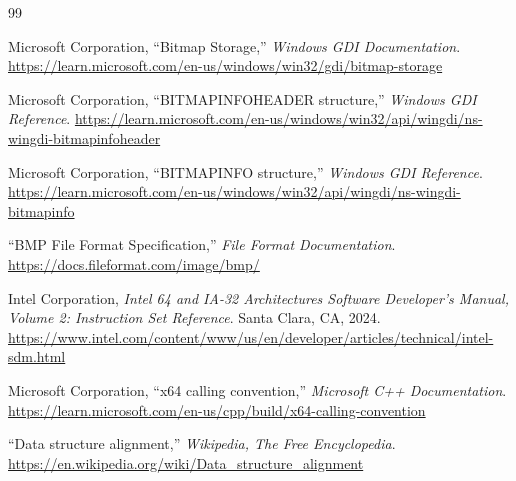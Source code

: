 \documentclass[12pt, letterpaper]{article}
\begin{document}
\begin{thebibliography}{99}

Microsoft Corporation, ``Bitmap Storage,'' \textit{Windows GDI Documentation}.
\url{https://learn.microsoft.com/en-us/windows/win32/gdi/bitmap-storage}

Microsoft Corporation, ``BITMAPINFOHEADER structure,'' \textit{Windows GDI Reference}.
\url{https://learn.microsoft.com/en-us/windows/win32/api/wingdi/ns-wingdi-bitmapinfoheader}

Microsoft Corporation, ``BITMAPINFO structure,'' \textit{Windows GDI Reference}.
\url{https://learn.microsoft.com/en-us/windows/win32/api/wingdi/ns-wingdi-bitmapinfo}

``BMP File Format Specification,'' \textit{File Format Documentation}.
\url{https://docs.fileformat.com/image/bmp/}

Intel Corporation, \textit{Intel\textregistered{} 64 and IA-32 Architectures Software Developer's Manual, Volume 2: Instruction Set Reference}. Santa Clara, CA, 2024.
\url{https://www.intel.com/content/www/us/en/developer/articles/technical/intel-sdm.html}

Microsoft Corporation, ``x64 calling convention,'' \textit{Microsoft C++ Documentation}.
\url{https://learn.microsoft.com/en-us/cpp/build/x64-calling-convention}

``Data structure alignment,'' \textit{Wikipedia, The Free Encyclopedia}.
\url{https://en.wikipedia.org/wiki/Data_structure_alignment}

\end{thebibliography}
\end{document}
